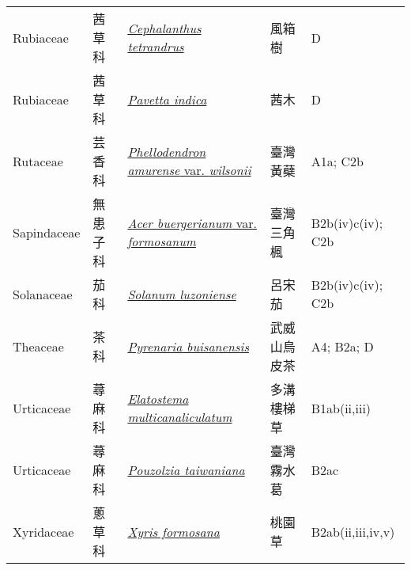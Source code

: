 {\begin{longtable}{p{2.5cm}p{2cm}p{5cm}p{2.5cm}p{3cm}}
    Rubiaceae & 茜草科 & \href{http://www.theplantlist.org/tpl1.1/search?q=Cephalanthus+tetrandrus}{\textit{Cephalanthus tetrandrus} } & 風箱樹 & D \index{Cephalanthus@\textit{Cephalanthus}!tetrandrus@\textit{tetrandrus}}  \index{風箱樹} \\
    Rubiaceae & 茜草科 & \href{http://www.theplantlist.org/tpl1.1/search?q=Pavetta+indica}{\textit{Pavetta indica} } & 茜木 & D \index{Pavetta@\textit{Pavetta}!indica@\textit{indica}}  \index{茜木} \\
    Rutaceae & 芸香科 & \href{http://www.theplantlist.org/tpl1.1/search?q=Phellodendron+amurense+var.+wilsonii}{\textit{Phellodendron amurense} var. \textit{wilsonii} } & 臺灣黃蘗 & A1a; C2b \index{Phellodendron@\textit{Phellodendron}!amurense@\textit{amurense}!var. wilsonii@var. \textit{wilsonii}}  \index{臺灣黃蘗} \\
    Sapindaceae & 無患子科 & \href{http://www.theplantlist.org/tpl1.1/search?q=Acer+buergerianum+var.+formosanum}{\textit{Acer buergerianum} var. \textit{formosanum} } & 臺灣三角楓 & B2b(iv)c(iv); C2b \index{Acer@\textit{Acer}!buergerianum@\textit{buergerianum}!var. formosanum@var. \textit{formosanum}}  \index{臺灣三角楓} \\
    Solanaceae & 茄科 & \href{http://www.theplantlist.org/tpl1.1/search?q=Solanum+luzoniense}{\textit{Solanum luzoniense} } & 呂宋茄 & B2b(iv)c(iv); C2b \index{Solanum@\textit{Solanum}!luzoniense@\textit{luzoniense}}  \index{呂宋茄} \\
    Theaceae & 茶科 & \href{http://www.theplantlist.org/tpl1.1/search?q=Pyrenaria+buisanensis}{\textit{Pyrenaria buisanensis} } & 武威山烏皮茶 & A4; B2a; D \index{Pyrenaria@\textit{Pyrenaria}!buisanensis@\textit{buisanensis}}  \index{武威山烏皮茶} \\
    Urticaceae & 蕁麻科 & \href{http://www.theplantlist.org/tpl1.1/search?q=Elatostema+multicanaliculatum}{\textit{Elatostema multicanaliculatum} } & 多溝樓梯草 & B1ab(ii,iii) \index{Elatostema@\textit{Elatostema}!multicanaliculatum@\textit{multicanaliculatum}}  \index{多溝樓梯草} \\
    Urticaceae & 蕁麻科 & \href{http://www.theplantlist.org/tpl1.1/search?q=Pouzolzia+taiwaniana}{\textit{Pouzolzia taiwaniana} } & 臺灣霧水葛 & B2ac \index{Pouzolzia@\textit{Pouzolzia}!taiwaniana@\textit{taiwaniana}}  \index{臺灣霧水葛} \\
    Xyridaceae & 蔥草科 & \href{http://www.theplantlist.org/tpl1.1/search?q=Xyris+formosana}{\textit{Xyris formosana} } & 桃園草 & B2ab(ii,iii,iv,v) \index{Xyris@\textit{Xyris}!formosana@\textit{formosana}}  \index{桃園草} \\
    \bottomrule
        \end{longtable}
        }
    